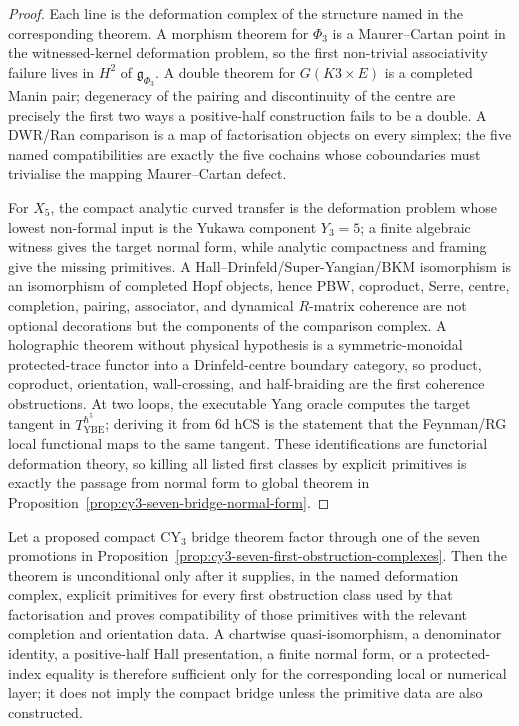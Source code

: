 \begin{proof}
Each line is the deformation complex of the structure named in the
corresponding theorem. A morphism theorem for $\Phi_3$ is a
Maurer--Cartan point in the witnessed-kernel deformation problem, so the
first non-trivial associativity failure lives in $H^2$ of
$\mathfrak g_{\Phi_3}$. A double theorem for $G(K3\times E)$ is a
completed Manin pair; degeneracy of the pairing and discontinuity of the
centre are precisely the first two ways a positive-half construction
fails to be a double. A DWR/Ran comparison is a map of factorisation
objects on every simplex; the five named compatibilities are exactly
the five cochains whose coboundaries must trivialise the mapping
Maurer--Cartan defect.

For $X_5$, the compact analytic curved transfer is the deformation
problem whose lowest non-formal input is the Yukawa component
$Y_3=5$; a finite algebraic witness gives the target normal form, while
analytic compactness and framing give the missing primitives. A
Hall--Drinfeld/Super-Yangian/BKM isomorphism is an isomorphism of
completed Hopf objects, hence PBW, coproduct, Serre, centre,
completion, pairing, associator, and dynamical $R$-matrix coherence are
not optional decorations but the components of the comparison complex.
A holographic theorem without physical hypothesis is a
symmetric-monoidal protected-trace functor into a Drinfeld-centre
boundary category, so product, coproduct, orientation, wall-crossing,
and half-braiding are the first coherence obstructions.
At two loops, the executable Yang oracle computes the target tangent in
$T_{\mathrm{YBE}}^{\hbar^5}$; deriving it from 6d hCS is the statement that the
Feynman/RG local functional maps to the same tangent. These
identifications are functorial deformation theory, so killing all
listed first classes by explicit primitives is exactly the passage from
normal form to global theorem in
Proposition~\ref{prop:cy3-seven-bridge-normal-form}.
\end{proof}

\begin{corollary}
\label{cor:cy3-primitive-criterion}
Let a proposed compact CY$_3$ bridge theorem factor through one of the
seven promotions in Proposition~\ref{prop:cy3-seven-first-obstruction-complexes}.
Then the theorem is unconditional only after it supplies, in the named
deformation complex, explicit primitives for every first obstruction
class used by that factorisation and proves compatibility of those
primitives with the relevant completion and orientation data. A
chartwise quasi-isomorphism, a denominator identity, a positive-half
Hall presentation, a finite normal form, or a protected-index equality
is therefore sufficient only for the corresponding local or numerical
layer; it does not imply the compact bridge unless the primitive data
are also constructed.
\end{corollary}

